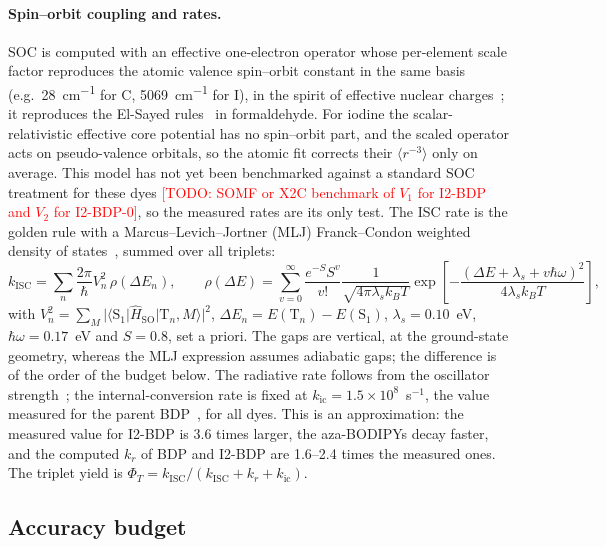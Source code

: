 \documentclass[journal=jctcce,manuscript=article,layout=twocolumn]{achemso}
\newcommand{\todo}[1]{\textcolor{red}{[TODO: #1]}}
\newcommand{\kisc}{k_\mathrm{ISC}}
\newcommand{\Hso}{\hat H_\mathrm{SO}}
\begin{document}
\paragraph{Spin--orbit coupling and rates.} SOC is computed with an effective one-electron operator
whose per-element scale factor reproduces the atomic valence spin--orbit constant in the same basis
(e.g.\ \SI{28}{cm^{-1}} for C, \SI{5069}{cm^{-1}} for I), in the spirit of effective nuclear
charges~\cite{Koseki1992}; it reproduces the El-Sayed rules~\cite{ElSayed1963} in formaldehyde. For
iodine the scalar-relativistic effective core potential has no spin--orbit part, and the scaled operator
acts on pseudo-valence orbitals, so the atomic fit corrects their $\langle r^{-3}\rangle$ only on average. This model has
not yet been benchmarked against a standard SOC treatment for these dyes \todo{SOMF or X2C benchmark of
$V_1$ for I2-BDP and $V_2$ for I2-BDP-0}, so the measured rates are its only test. The ISC
rate is the golden rule with a Marcus--Levich--Jortner (MLJ) Franck--Condon weighted density of
states~\cite{Jortner1976}, summed over all triplets:
\begin{equation}
  \kisc = \sum_n \frac{2\pi}{\hbar} V_n^2\,\rho(\Delta E_n),\qquad
  \rho(\Delta E) = \sum_{v=0}^{\infty} \frac{e^{-S}S^v}{v!}
  \frac{1}{\sqrt{4\pi\lambda_s k_BT}}
  \exp\!\left[-\frac{(\Delta E + \lambda_s + v\hbar\omega)^2}{4\lambda_s k_BT}\right],
  \label{eq:mlj}
\end{equation}
with $V_n^2=\sum_M\lvert\langle\mathrm{S}_1\rvert\Hso\lvert\mathrm{T}_n,M\rangle\rvert^2$,
$\Delta E_n=E(\mathrm{T}_n)-E(\mathrm{S}_1)$, $\lambda_s=0.10$~eV, $\hbar\omega=0.17$~eV and $S=0.8$,
set a priori. The gaps are vertical, at the ground-state geometry, whereas the MLJ expression assumes
adiabatic gaps; the difference is of the order of the budget below. The radiative rate follows from the oscillator strength~\cite{Strickler1962}; the
internal-conversion rate is fixed at $k_\mathrm{ic}=1.5\times10^{8}$~s$^{-1}$, the value measured for the
parent BDP~\cite{Ly2021}, for all dyes. This is an approximation: the measured value for I2-BDP is 3.6
times larger, the aza-BODIPYs decay faster, and the computed $k_r$ of BDP and I2-BDP are 1.6--2.4 times the
measured ones. The triplet yield is $\Phi_T=\kisc/(\kisc+k_r+k_\mathrm{ic})$.

\subsection{Accuracy budget}
\label{sec:budget-method}
\end{document}
